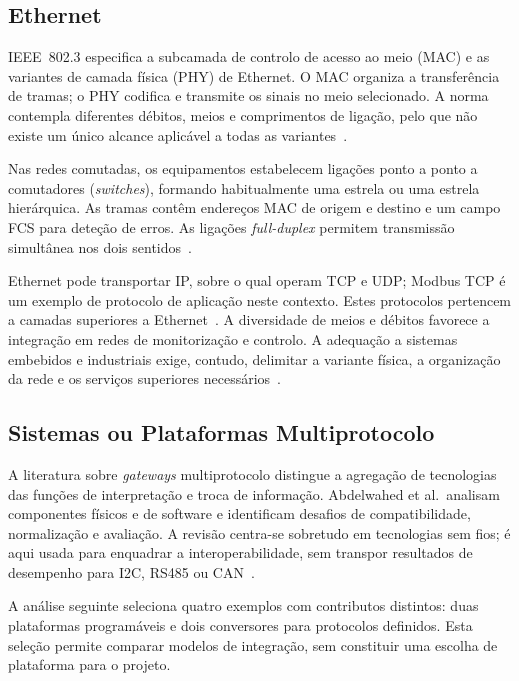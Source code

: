 \subsection{Ethernet}

IEEE~802.3 especifica a subcamada de controlo de acesso ao meio (MAC) e
as variantes de camada física (PHY) de Ethernet. O MAC organiza a
transferência de tramas; o PHY codifica e transmite os sinais no meio
selecionado. A norma contempla diferentes débitos, meios e comprimentos
de ligação, pelo que não existe um único alcance aplicável a todas
as variantes~\cite{ieee_8023_2018}.

Nas redes comutadas, os equipamentos estabelecem ligações ponto a ponto
a comutadores (\textit{switches}), formando habitualmente uma estrela
ou uma estrela hierárquica. As tramas contêm endereços MAC de origem e
destino e um campo FCS para deteção de erros. As ligações
\textit{full-duplex} permitem transmissão simultânea nos dois
sentidos~\cite{simmons_ethernet_2008}.

Ethernet pode transportar IP, sobre o qual operam TCP e UDP;
Modbus TCP é um exemplo de protocolo de aplicação neste contexto.
Estes protocolos pertencem a camadas superiores a
Ethernet~\cite{simmons_ethernet_2008,modbus_specifications}.
A diversidade de meios e débitos favorece a integração em redes de
monitorização e controlo. A adequação a sistemas embebidos e industriais
exige, contudo, delimitar a variante física, a organização da rede e
os serviços superiores necessários~\cite{ieee_8023_2018,simmons_ethernet_2008}.

\subsection{Sistemas ou Plataformas Multiprotocolo}

A literatura sobre \textit{gateways} multiprotocolo distingue a agregação
de tecnologias das funções de interpretação e troca de informação.
Abdelwahed et al.\ analisam componentes físicos e de software e
identificam desafios de compatibilidade, normalização e avaliação.
A revisão centra-se sobretudo em tecnologias sem fios; é aqui usada
para enquadrar a interoperabilidade, sem transpor resultados de
desempenho para I2C, RS485 ou CAN~\cite{abdelwahed_gateway_2025}.

A análise seguinte seleciona quatro exemplos com contributos distintos:
duas plataformas programáveis e dois conversores para protocolos
definidos. Esta seleção permite comparar modelos de integração, sem
constituir uma escolha de plataforma para o projeto.

